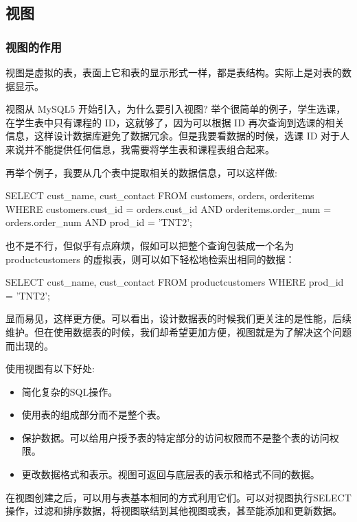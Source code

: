 \subsection{视图}

\subsubsection{视图的作用}

视图是虚拟的表，表面上它和表的显示形式一样，都是表结构。实际上是对表的数据显示。

视图从 MySQL5 开始引入，为什么要引入视图? 举个很简单的例子，学生选课，在学生表中只有课程的 ID，这就够了，因为可以根据 ID 再次查询到选课的相关信息，这样设计数据库避免了数据冗余。但是我要看数据的时候，选课 ID 对于人来说并不能提供任何信息，我需要将学生表和课程表组合起来。

再举个例子，我要从几个表中提取相关的数据信息，可以这样做:
\begin{sql}
SELECT cust_name, cust_contact
    FROM customers, orders, orderitems
    WHERE customers.cust_id = orders.cust_id
      AND orderitems.order_num = orders.order_num
      AND prod_id = 'TNT2';
\end{sql}

也不是不行，但似乎有点麻烦，假如可以把整个查询包装成一个名为productcustomers 的虚拟表，则可以如下轻松地检索出相同的数据：

\begin{sql}
SELECT cust_name, cust_contact
    FROM productcustomers
    WHERE prod_id = 'TNT2';
\end{sql}

显而易见，这样更方便。可以看出，设计数据表的时候我们更关注的是性能，后续维护。但在使用数据表的时候，我们却希望更加方便，视图就是为了解决这个问题而出现的。

使用视图有以下好处:
\begin{itemize}
    \item 简化复杂的SQL操作。
    \item 使用表的组成部分而不是整个表。
    \item 保护数据。可以给用户授予表的特定部分的访问权限而不是整个表的访问权限。
    \item 更改数据格式和表示。视图可返回与底层表的表示和格式不同的数据。
\end{itemize}

在视图创建之后，可以用与表基本相同的方式利用它们。可以对视图执行SELECT 操作，过滤和排序数据，将视图联结到其他视图或表，甚至能添加和更新数据。

